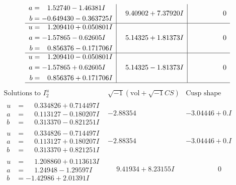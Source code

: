 \documentclass[1p]{elsarticle_modified}
\theoremstyle{definition}
\newcommand{\I}{\sqrt{-1}}
\begin{document}
$$\begin{array}{c|c|c}
\begin{aligned}
a &= \phantom{-}1.52740 - 1.46381 I \\
b &= -0.649430 - 0.363725 I\end{aligned}
 & \phantom{-}9.40902 + 7.37920 I & \phantom{-0.000000 } 0 \\ \hline\begin{aligned}
u &= \phantom{-}1.209410 + 0.050801 I \\
a &= -1.57865 - 0.62605 I \\
b &= \phantom{-}0.856376 - 0.171706 I\end{aligned}
 & \phantom{-}5.14325 + 1.81373 I & \phantom{-0.000000 } 0 \\ \hline\begin{aligned}
u &= \phantom{-}1.209410 - 0.050801 I \\
a &= -1.57865 + 0.62605 I \\
b &= \phantom{-}0.856376 + 0.171706 I\end{aligned}
 & \phantom{-}5.14325 - 1.81373 I & \phantom{-0.000000 } 0\\
 \hline 
 \end{array}$$\newpage$$\begin{array}{c|c|c}  
\text{Solutions to }I^u_{2}& \I (\text{vol} + \sqrt{-1}CS) & \text{Cusp shape}\\
 \hline 
\begin{aligned}
u &= \phantom{-}0.334826 + 0.714497 I \\
a &= \phantom{-}0.113127 - 0.180207 I \\
b &= \phantom{-}0.313370 - 0.821251 I\end{aligned}
 & -2.88354\phantom{ +0.000000I} & -3.04446 + 0. I\phantom{ +0.000000I} \\ \hline\begin{aligned}
u &= \phantom{-}0.334826 - 0.714497 I \\
a &= \phantom{-}0.113127 + 0.180207 I \\
b &= \phantom{-}0.313370 + 0.821251 I\end{aligned}
 & -2.88354\phantom{ +0.000000I} & -3.04446 + 0. I\phantom{ +0.000000I} \\ \hline\begin{aligned}
u &= \phantom{-}1.208860 + 0.113613 I \\
a &= \phantom{-}1.24948 - 1.29597 I \\
b &= -1.42986 + 2.01391 I\end{aligned}
 & \phantom{-}9.41934 + 8.23155 I & \phantom{-0.000000 } 0 \\ \hline\begin{aligned}

\end{aligned}
\end{array}$$
\end{document}
